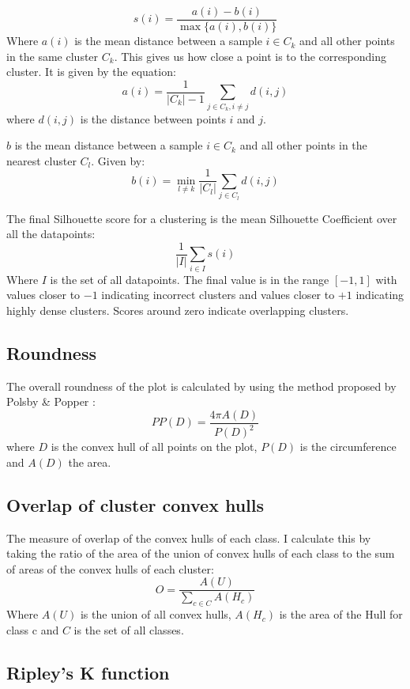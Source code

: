 \documentclass[a4paper, 12pt, twoside]{report}
\begin{document}
\[s(i) = \frac{a(i) - b(i)}{\max\{a(i), b(i)\}} \]
Where $a(i)$ is the mean distance between a sample \(i \in C_{k}\) and all other points in the same cluster \(C_{k}\). This gives us how close a point is to the corresponding cluster. It is given by the equation:
\[ a(i) = \frac{1}{|C_{k}| - 1} \sum_{j \in C_{k}, i \neq j}{d(i,j)}\]
where \(d(i,j)\) is the distance between points \(i\) and \(j\).

\(b\) is the mean distance between a sample \(i \in C_{k}\) and all other points in the nearest cluster \(C_{l}\). Given by:
\[ b(i) = \min_{l \neq k}{\frac{1}{|C_{l}|} \sum_{j \in C_{l}}{d(i,j)}} \]

The final Silhouette score for a clustering is the mean Silhouette Coefficient over all the datapoints:
\[ \frac{1}{|I|}\sum_{i \in I}{s(i)} \]
Where \(I\) is the set of all datapoints. The final value is in the range \([-1, 1]\) with values closer to $-1$ indicating incorrect clusters and values closer to $+1$ indicating highly dense clusters. Scores around zero indicate overlapping clusters.

\subsection{Roundness}
\label{sec:org7b61201}

The overall roundness of the plot is calculated by using the method proposed by Polsby \& Popper \cite{popper}:
\[PP(D) = \frac{4 \pi A(D)}{P(D)^{2}} \]
where \(D\) is the convex hull of all points on the plot, \(P(D)\) is the circumference and \(A(D)\) the area.
\subsection{Overlap of cluster convex hulls}
\label{sec:org274a5d2}

The measure of overlap of the convex hulls of each class. I calculate this by taking the ratio of the area of the union of convex hulls of each class to the sum of areas of the convex hulls of each cluster:
\[ O = \frac{A(U)}{\sum_{c \in C}A(H_{c})} \]
Where \(A(U)\) is the union of all convex hulls, \(A(H_{c})\) is the area of the Hull for class c and \(C\) is the set of all classes.
\subsection{Ripley's K function}
\label{sec:org533d625}
\end{document}
